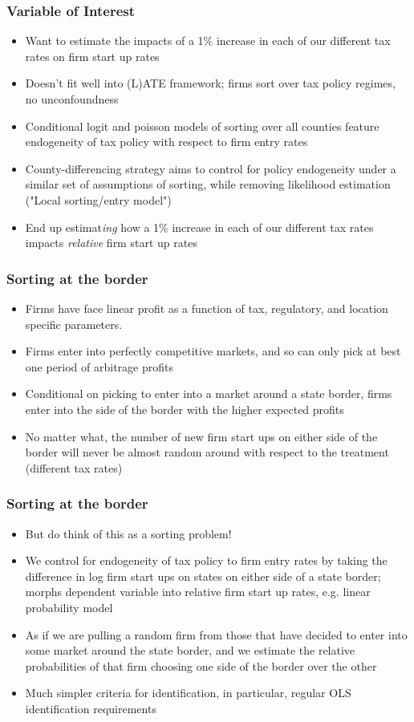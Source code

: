 \documentclass{beamer}
\begin{document}
\begin{frame}
\frametitle{Variable of Interest}
\begin{itemize}
\item Want to estimate the impacts of a 1\% increase in each of our different tax rates on firm start up rates
\item Doesn't fit well into (L)ATE framework; firms sort over tax policy regimes, no unconfoundness
\item Conditional logit and poisson models of sorting over all counties feature endogeneity of tax policy with respect to firm entry rates
\item County-differencing strategy aims to control for policy endogeneity under a similar set of assumptions of sorting, while removing likelihood estimation ("Local sorting/entry model")
\item End up estimat\textit{ing}  how a 1\% increase in each of our different tax rates impacts \textit{relative} firm start up rates
\end{itemize}
\end{frame}

\begin{frame}
\frametitle{Sorting at the border}
\begin{itemize}
\item Firms have face linear profit as a function of tax, regulatory, and location specific parameters.
\item Firms enter into perfectly competitive markets, and so can only pick at best one period of arbitrage profits
\item Conditional on picking to enter into a market around a state border, firms enter into the side of the border with the higher expected profits
\item No matter what, the number of new firm start ups on either side of the border will never be almost random around with respect to the treatment (different tax rates)
\end{itemize}
\end{frame}

\begin{frame}
\frametitle{Sorting at the border}
\begin{itemize}
\item But do think of this as a sorting problem!
\item We control for endogeneity of tax policy to firm entry rates by taking the difference in log firm start ups on states on either side of a state border; morphs dependent variable into relative firm start up rates, e.g. linear probability model
\item As if we are pulling a random firm from those that have decided to enter into some market around the state border, and we estimate the relative probabilities of that firm choosing one side of the border over the other
\item Much simpler criteria for identification, in particular, regular OLS identification requirements
\end{itemize}
\end{frame}
\end{document}
